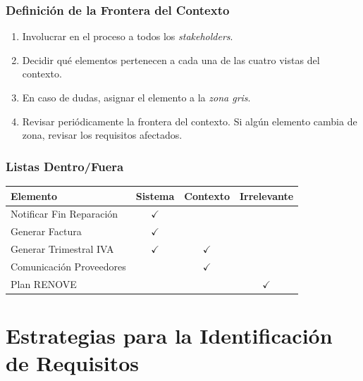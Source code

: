 ﻿\documentclass[handout,a4paper,slidestop,xcolor=pst,dvips,blue]{beamer}
\begin{document}
\begin{frame}[c]
    \frametitle{Definición de la Frontera del Contexto}
    \begin{enumerate}[<+->]
        \item Involucrar en el proceso a todos los \emph{stakeholders}.
        \item Decidir qué elementos pertenecen a cada una de las cuatro vistas del contexto.
        \item En caso de dudas, asignar el elemento a la \emph{zona gris}.
        \item Revisar periódicamente la frontera del contexto. Si algún elemento cambia de zona, revisar los requisitos afectados.
    \end{enumerate}
\end{frame}

\begin{frame}[c]
     \frametitle{Listas Dentro/Fuera}
     \begin{center}
     \begin{tabular}{||l||c|c|c||}
     \hline \hline
     \textbf{Elemento}          & \textbf{Sistema} & \textbf{Contexto} & \textbf{Irrelevante} \\ \hline \hline
     Notificar Fin Reparación   &   $\checkmark$   &                   &                      \\ \hline
     Generar Factura            &   $\checkmark$   &                   &                      \\ \hline
     Generar Trimestral IVA     &   $\checkmark$   & $\checkmark$      &                      \\ \hline
     Comunicación Proveedores   &                  & $\checkmark$      &                      \\ \hline
     Plan RENOVE                &                  &                   & $\checkmark$         \\ \hline
     \hline
     \end{tabular}
     \end{center}
\end{frame}

\section{Estrategias para la Identificación de Requisitos}
\end{document}
